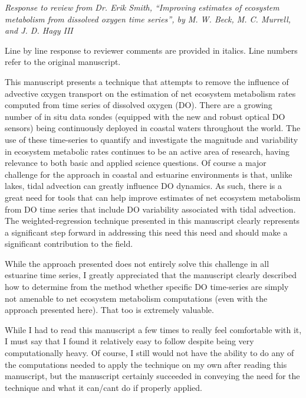\documentclass[letterpaper,12pt]{article}\usepackage[]{graphicx}\usepackage[]{color}
\begin{document}
\raggedright


{\it Response to review from Dr. Erik Smith, ``Improving estimates of ecosystem metabolism from dissolved oxygen time series'', by M. W. Beck, M. C. Murrell, and J. D. Hagy III}

Line by line response to reviewer comments are provided in italics.  Line numbers refer to the original manuscript. 

This manuscript presents a technique that attempts to remove the influence of advective oxygen transport on the estimation of net ecosystem metabolism rates computed from time series of dissolved oxygen (DO). There are a growing number of in situ data sondes (equipped with the new and robust optical DO sensors) being continuously deployed in coastal waters throughout the world. The use of these time-series to quantify and investigate the magnitude and variability in ecosystem metabolic rates continues to be an active area of research, having relevance to both basic and applied science questions. Of course a major challenge for the approach in coastal and estuarine environments is that, unlike lakes, tidal advection can greatly influence DO dynamics. As such, there is a great need for tools that can help improve estimates of net ecosystem metabolism from DO time series that include DO variability associated with tidal advection. The weighted-regression technique presented in this manuscript clearly represents a significant step forward in addressing this need this need and should make a significant contribution to the field.

While the approach presented does not entirely solve this challenge in all estuarine time series, I greatly appreciated that the manuscript clearly described how to determine from the method whether specific DO time-series are simply not amenable to net ecosystem metabolism computations (even with the approach presented here). That too is extremely valuable. 

While I had to read this manuscript a few times to really feel comfortable with it, I must say that I found it relatively easy to follow despite being very computationally heavy. Of course, I still would not have the ability to do any of the computations needed to apply the technique on my own after reading this manuscript, but the manuscript certainly succeeded in conveying the need for the technique and what it can/cant do if properly applied.
\end{document}
